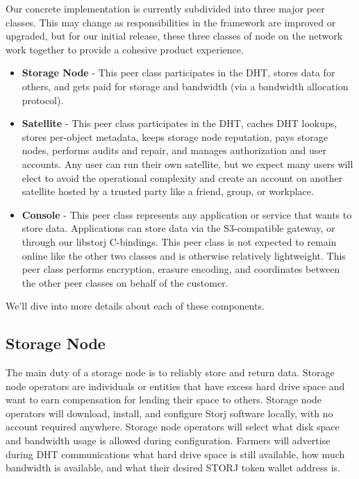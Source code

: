 \documentclass[a4paper,10pt]{article} \usepackage[utf8]{inputenc}
\begin{document}
Our concrete implementation is currently subdivided into three major peer
classes. This may change as responsibilities in the framework are improved or
upgraded, but for our initial release, these three classes of node on the
network work together to provide a cohesive product experience.

\begin{itemize}
\item {\bf Storage Node} - This peer class participates in the DHT, stores data 
for
  others, and gets paid for storage and bandwidth (via a bandwidth allocation
  protocol).
\item {\bf Satellite} - This peer class participates in the DHT, caches
  DHT lookups, stores per-object metadata, keeps storage node reputation, pays
  storage nodes, performs audits and repair, and manages authorization and user
  accounts. Any user can run their own satellite, but we expect many users
  will elect to avoid the operational complexity and create an account on
  another satellite hosted by a trusted party like a friend, group, or
  workplace.
\item {\bf Console} - This peer class represents any application or
  service that wants to store data. Applications can store data via the
  S3-compatible gateway, or through our libstorj C-bindings. This peer class
  is not expected to remain online like the other two classes and is otherwise
  relatively lightweight. This peer class performs encryption, erasure encoding,
  and coordinates between the other peer classes on behalf of the customer.
\end{itemize}

We'll dive into more details about each of these components.

\subsection{Storage Node}

The main duty of a storage node is to reliably store and return data. 
Storage node operators
are individuals or entities that have excess hard drive space and want to earn
compensation for lending their space to others. Storage node operators will 
download,
install, and configure Storj software locally, with no account required
anywhere. Storage node operators will select what disk space and bandwidth usage
is allowed during configuration.
Farmers will advertise during DHT communications what hard drive space is still
available, how much bandwidth is available, and what their desired STORJ token
wallet address is.
\end{document}
